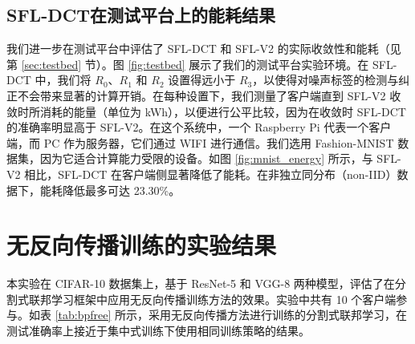 \subsection{SFL-DCT在测试平台上的能耗结果}



我们进一步在测试平台中评估了 SFL-DCT 和 SFL-V2 的实际收敛性和能耗（见第 \ref{sec:testbed} 节）。图 \ref{fig:testbed} 展示了我们的测试平台实验环境。在 SFL-DCT 中，我们将 $R_0$、$R_1$ 和 $R_2$ 设置得远小于 $R_3$，以使得对噪声标签的检测与纠正不会带来显著的计算开销。在每种设置下，我们测量了客户端直到 SFL-V2 收敛时所消耗的能量（单位为 kWh），以便进行公平比较，因为在收敛时 SFL-DCT 的准确率明显高于 SFL-V2。在这个系统中，一个 Raspberry Pi 代表一个客户端，而 PC 作为服务器，它们通过 WIFI 进行通信。我们选用 Fashion-MNIST 数据集，因为它适合计算能力受限的设备。如图 \ref{fig:mnist_energy} 所示，与 SFL-V2 相比，SFL-DCT 在客户端侧显著降低了能耗。在非独立同分布（non-IID）数据下，能耗降低最多可达 23.30\%。

\section{无反向传播训练的实验结果}
本实验在 CIFAR-10 数据集上，基于 ResNet-5 和 VGG-8 两种模型，评估了在分割式联邦学习框架中应用无反向传播训练方法的效果。实验中共有 10 个客户端参与。如表 \ref{tab:bpfree} 所示，采用无反向传播方法进行训练的分割式联邦学习，在测试准确率上接近于集中式训练下使用相同训练策略的结果。

